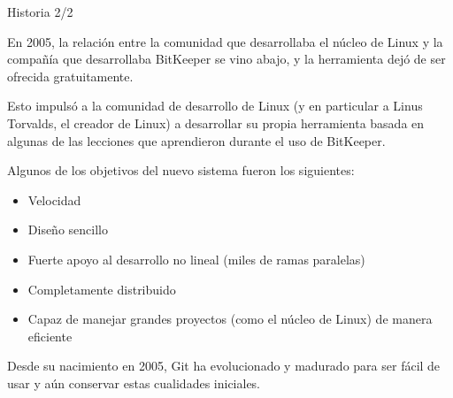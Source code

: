 \documentclass{beamer}
\begin{document}
\begin{frame}{Historia 2/2}

    En 2005, la relación entre la comunidad que desarrollaba el núcleo de Linux y la compañía que desarrollaba
    BitKeeper se vino abajo, y la herramienta dejó de ser ofrecida gratuitamente.

    \vspace{0.5em}

    Esto impulsó a la comunidad de desarrollo de Linux (y en particular a Linus Torvalds, el creador de Linux) a desarrollar su propia herramienta
    basada en algunas de las lecciones que aprendieron durante el uso de BitKeeper.

    \vspace{0.5em}

    Algunos de los objetivos del nuevo sistema fueron los siguientes:

    \begin{itemize}
        \item Velocidad
        \item Diseño sencillo
        \item Fuerte apoyo al desarrollo no lineal (miles de ramas paralelas)
        \item Completamente distribuido
        \item Capaz de manejar grandes proyectos (como el núcleo de Linux) de manera eficiente
    \end{itemize}

    \vspace{0.5em}

    Desde su nacimiento en 2005, Git ha evolucionado y madurado para ser fácil de usar y aún conservar estas cualidades iniciales.

\end{frame}
\end{document}
